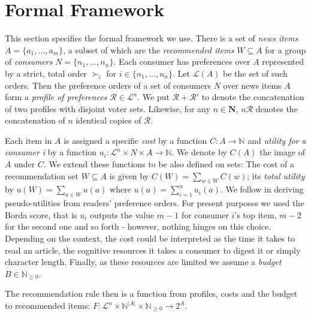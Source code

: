 \documentclass{article}
\begin{document}
\hypertarget{framework}{\section{Formal Framework}}
This section specifies the formal framework we use.
There is a set of \emph {news items} $A=\{a_1,\dotsc,a_m\}$, a subset of which are the \emph {recommended items} $W\subseteq A$ for a group of \emph {consumers} $N=\{n_1,\dotsc,n_n\}$. Each consumer has preferences over $A$ represented by a strict, total order $\succ_i$ for $i\in \{ n_1, \dotsc, n_n\}$. Let $\mathcal{L}(A)$ be the set of such orders. Then the preference orders of a set of consumers $N$ over news items $A$ form a \emph {profile of preferences} $\mathcal{R}\in \mathcal{L}^n$. We put $\mathcal{R}+\mathcal{R'}$ to denote the concatenation of two profiles with disjoint voter sets. Likewise, for any $n\in \mathbf{N}$, $n\mathcal{R}$ denotes the concatenation of $n$ identical copies of $\mathcal{R}$.

Each item in $A$ is assigned a specific \emph{cost} by a function
 $C:A \rightarrow {\mathbb N}$ and \emph{utility for a consumer i} by a function $u_i:\mathcal{L}^n \times N \times  A \rightarrow \mathbb{N}$. We denote by $C(A)$ the image of $A$ under $C$. We extend these functions to be also defined on sets: The cost of a recommendation set $W\subseteq A$ is given by $C(W)=\sum_{w\in W}C(w)$; its \emph {total utility} by $u(W)=\sum_{a\in W} u(a)$ where $u(a)=\sum_{i=1}^n u_i(a)$.
We follow  in deriving pseudo-utilities from readers' preference orders. For present purposes we used the Borda score, that is $u_i$ outputs the value $m-1$ for consumer $i$'s top item, $m-2$ for the second one and so forth - however, nothing hinges on this choice.
Depending on the context, the cost could be interpreted as the time it takes to read an article,
the cognitive resources it takes a consumer to digest it or simply character length.
 Finally, as these resources are limited we assume a \emph {budget} $B\in \mathbb{N}_{\geq 0}$.

The recommendation rule then is a function from profiles, costs and the budget to recommended items: $F:\mathcal{L}^n\times \mathbb{N}^{|A|}\times \mathbb{N}_{\geq 0} \rightarrow 2^A$.
\end{document}
